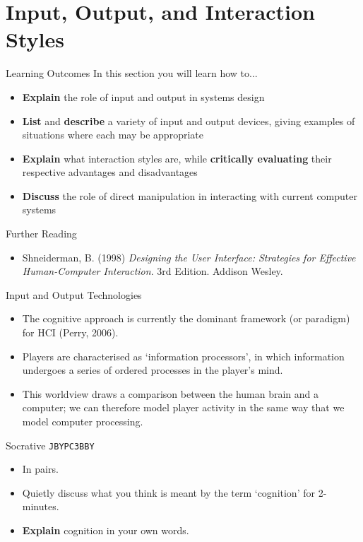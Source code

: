 \part{Input, Output, and Interaction Styles}
\frame{\partpage}

\begin{frame}{Learning Outcomes}
	In this section you will learn how to...
	
	\begin{itemize}
		\item \textbf{Explain} the role of input and output in systems design
		\item \textbf{List} and \textbf{describe} a variety of input and output devices, giving examples of situations where each may be appropriate
		\item \textbf{Explain} what interaction styles are, while \textbf{critically evaluating} their respective advantages and disadvantages
		\item \textbf{Discuss} the role of direct manipulation in interacting with current computer systems
	\end{itemize}
\end{frame}

\begin{frame}{Further Reading}
	\begin{itemize}
		\item Shneiderman, B. (1998) \textit{Designing the User Interface: Strategies for Effective Human-Computer Interaction}. 3rd Edition. Addison Wesley.
	\end{itemize}
\end{frame}

\begin{frame}{Input and Output Technologies}
	\begin{itemize}
		\item The cognitive approach is currently the dominant framework (or paradigm) for HCI (Perry, 2006).
		\item Players are characterised as `information processors', in which information undergoes a series of ordered processes
		in the player's mind.
		\item This worldview draws a comparison between the human brain and a computer; we can therefore model player activity in the same
		way that we model computer processing.
	\end{itemize}
\end{frame}

\begin{frame}[fragile]{Socrative \texttt{JBYPC3BBY}}
	\begin{itemize}
		\item In pairs.
		\item Quietly discuss what you think is meant by the term `cognition' for 2-minutes.
		\item \textbf{Explain} cognition in your own words.
	\end{itemize}
\end{frame}

